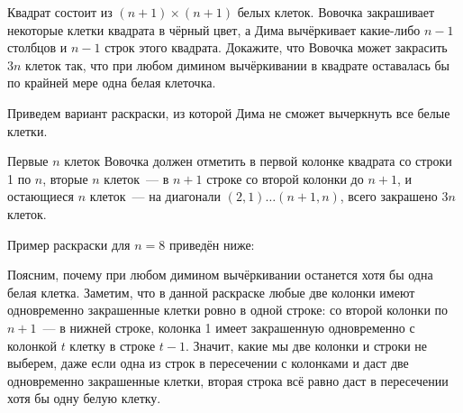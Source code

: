 \begin{itemize}
\itC Квадрат состоит из $(n+1) \times (n+1)$ белых клеток. Вовочка закрашивает некоторые клетки квадрата в чёрный цвет, а Дима вычёркивает какие-либо $n-1$ столбцов и $n-1$ строк этого квадрата. Докажите, что Вовочка может закрасить $3n$ клеток так, что при любом димином вычёркивании в квадрате оставалась бы по крайней мере одна белая клеточка.

\itr Приведем вариант раскраски, из которой Дима не сможет вычеркнуть все белые клетки. 

Первые $n$ клеток Вовочка должен отметить в первой колонке квадрата со строки 1 по $n$, 
вторые $n$ клеток~--- в $n+1$ строке со второй колонки до $n+1$, и остающиеся $n$ клеток~---
на диагонали $(2,1) \dots (n+1,n)$, всего закрашено $3n$ клеток.
          
Пример раскраски для $n=8$ приведён ниже:

\begin{center}\end{center}

Поясним, почему при любом димином вычёркивании останется хотя бы одна белая клетка. 
Заметим, что в данной раскраске любые две 
колонки имеют одновременно закрашенные клетки ровно в одной строке: со второй колонки по $n+1$~--- 
в нижней строке, колонка 1 имеет закрашенную одновременно с колонкой $t$ клетку в строке $t-1$.
Значит, какие мы две колонки и строки не выберем, даже если одна из строк в пересечении с колонками
и даст две одновременно закрашенные клетки, вторая строка всё равно даст в пересечении хотя бы одну белую 
клетку.

\end{itemize}
